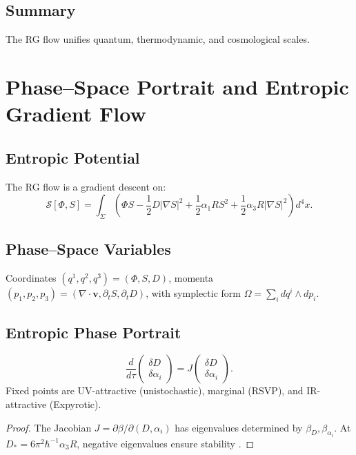\documentclass[12pt]{article}
\begin{document}
\subsection{Summary}

The RG flow unifies quantum, thermodynamic, and cosmological scales.

\section{Phase–Space Portrait and Entropic Gradient Flow}
\label{app:phase-space}

\subsection{Entropic Potential}

The RG flow is a gradient descent on:
\[
\mathcal{S}[\Phi, S] = \int_\Sigma \left( \Phi S - \frac{1}{2} D |\nabla S|^2 + \frac{1}{2} \alpha_1 R S^2 + \frac{1}{2} \alpha_3 R |\nabla S|^2 \right) d^4x.
\]

\subsection{Phase–Space Variables}

Coordinates \((q^1, q^2, q^3) = (\Phi, S, D)\), momenta \((p_1, p_2, p_3) = (\nabla \cdot \mathbf{v}, \partial_t S, \partial_t D)\), with symplectic form \(\Omega = \sum_i dq^i \wedge dp_i\).

\subsection{Entropic Phase Portrait}

\[
\frac{d}{d\tau} \begin{pmatrix} \delta D \\ \delta \alpha_i \end{pmatrix} = J \begin{pmatrix} \delta D \\ \delta \alpha_i \end{pmatrix}.
\]
Fixed points are UV-attractive (unistochastic), marginal (RSVP), and IR-attractive (Expyrotic).

\begin{proof}
The Jacobian \(J = \partial \beta / \partial (D, \alpha_i)\) has eigenvalues determined by \(\beta_D, \beta_{\alpha_i}\). At \(D_* = 6 \pi^2 \hbar^{-1} \alpha_3 R\), negative eigenvalues ensure stability \citep{Wilson1983}.
\end{proof}
\end{document}
